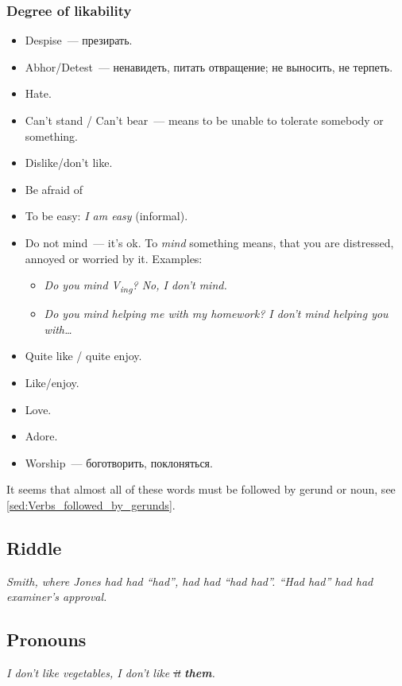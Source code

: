 \documentclass[10pt,a4paper]{article}
\begin{document}
\subsubsection{Degree of likability}
\begin{itemize}
  \item Despise~--- презирать.
  \item Abhor/Detest~--- ненавидеть, питать отвращение; не выносить, не терпеть.
  \item Hate.
  \item Can't stand / Can't bear~--- means to be unable to tolerate somebody or something.
  \item Dislike/don't like.
  \item Be afraid of
  \item To be easy: \textit{I am easy} (informal).
  \item Do not mind~--- it's ok. To \textit{mind} something means, that you are distressed, annoyed or worried
  by it. Examples:
  \begin{itemize}
    \item \textit{Do you mind V\textsubscript{ing}? No, I don't mind.}
    \item \textit{Do you mind helping me with my homework? I don't mind helping you with\dots}
  \end{itemize}
  \item Quite like / quite enjoy.
  \item Like/enjoy.
  \item Love.
  \item Adore.
  \item Worship~--- боготворить, поклоняться.
\end{itemize}
\vspace{-\parskip}
It seems that almost all of these words must be followed by gerund or noun, see \ref{sed:Verbs_followed_by_gerunds}.


\subsection{Riddle}
\textit{Smith, where Jones had had ``had'', had had ``had had''. ``Had had'' had had examiner's approval.}




\subsection{Pronouns}
\textit{I don’t like vegetables, I don't like \sout{it} \textbf{them}.}
\end{document}
